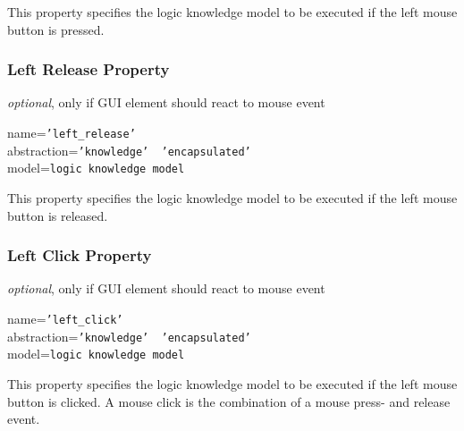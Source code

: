 This property specifies the logic knowledge model to be executed if the left
mouse button is pressed.

\subsubsection{Left Release Property}

\emph{optional}, only if GUI element should react to mouse event

name=\texttt{'left\_release'}\\
abstraction=\texttt{'knowledge' \vline\ 'encapsulated'}\\
model=\texttt{logic knowledge model}

This property specifies the logic knowledge model to be executed if the left
mouse button is released.

\subsubsection{Left Click Property}

\emph{optional}, only if GUI element should react to mouse event

name=\texttt{'left\_click'}\\
abstraction=\texttt{'knowledge' \vline\ 'encapsulated'}\\
model=\texttt{logic knowledge model}

This property specifies the logic knowledge model to be executed if the left
mouse button is clicked. A mouse click is the combination of a mouse press- and
release event.
